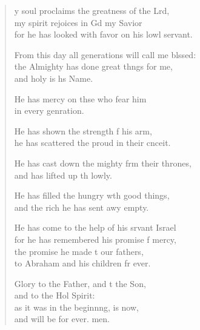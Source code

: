 \settowidth{\versewidth}{From this day all generations will call me blessed: +}
\begin{verse}%
  \begin{patverse}
y soul proclaims the greatness of the Lrd,\Flex\\
my spirit rejoices in Gd my Savior\Med\\
for he has looked with favor on his lowl servant.

From this day all generations will call me blssed:\Flex\\
the Almighty has done great th\pointup{\i}ngs for me,\Med\\
and holy is h\pointup{\i}s Name.

He has mercy on thse who fear him\Med\\
in every genration.

He has shown the strength f his arm,\Med\\
he has scattered the proud in their cnceit.

He has cast down the mighty frm their thrones,\Med\\
and has lifted up th lowly.

He has filled the hungry w\pointup{\i}th good things,\Med\\
and the rich he has sent awy empty.

He has come to the help of his srvant Israel\Med\\
for he has remembered his promise f mercy,\\
the promise he made t our fathers,\Med\\
to Abraham and his children fr ever.

Glory to the Father, and t the Son,\Med\\
and to the Hol Spirit:\\
as it was in the beginn\pointup{\i}ng, is now,\Med\\
and will be for ever. men.
  \end{patverse}
\end{verse}
